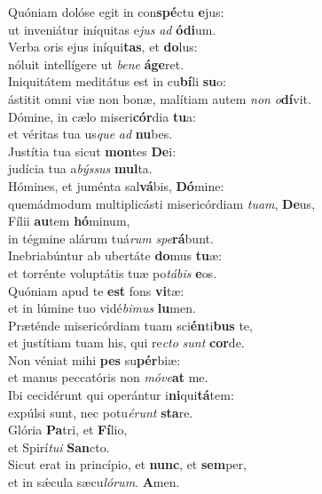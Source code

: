 \evenverse Quóniam dolóse egit in con\textbf{spé}ctu \textbf{e}jus:~\*\\
\evenverse ut inveniátur iníquitas e\textit{jus} \textit{ad} \textbf{ó}\textbf{di}um.\\
\oddverse Verba oris ejus iníqui\textbf{tas}, et \textbf{do}lus:~\*\\
\oddverse nóluit intellígere ut \textit{be}\textit{ne} \textbf{á}\textbf{ge}ret.\\
\evenverse Iniquitátem meditátus est in cu\textbf{bí}li \textbf{su}o:~\*\\
\evenverse ástitit omni viæ non bonæ, malítiam autem \textit{non} \textit{o}\textbf{dí}vit.\\
\oddverse Dómine, in cælo miseri\textbf{cór}dia \textbf{tu}a:~\*\\
\oddverse et véritas tua us\textit{que} \textit{ad} \textbf{nu}bes.\\
\evenverse Justítia tua sicut \textbf{mon}tes \textbf{De}i:~\*\\
\evenverse judícia tua a\textit{býs}\textit{sus} \textbf{mul}ta.\\
\oddverse Hómines, et juménta sal\textbf{vá}bis, \textbf{Dó}mine:~\*\\
\oddverse quemádmodum multiplicásti misericórdiam \textit{tu}\textit{am}, \textbf{De}us,\\
\evenverse Fílii \textbf{au}tem \textbf{hó}minum,~\*\\
\evenverse in tégmine alárum tuá\textit{rum} \textit{spe}\textbf{rá}bunt.\\
\oddverse Inebriabúntur ab ubertáte \textbf{do}mus \textbf{tu}æ:~\*\\
\oddverse et torrénte voluptátis tuæ po\textit{tá}\textit{bis} \textbf{e}os.\\
\evenverse Quóniam apud te \textbf{est} fons \textbf{vi}tæ:~\*\\
\evenverse et in lúmine tuo vidé\textit{bi}\textit{mus} \textbf{lu}men.\\
\oddverse Præténde misericórdiam tuam sci\textbf{én}ti\textbf{bus} te,~\*\\
\oddverse et justítiam tuam his, qui re\textit{cto} \textit{sunt} \textbf{cor}de.\\
\evenverse Non véniat mihi \textbf{pes} su\textbf{pér}biæ:~\*\\
\evenverse et manus peccatóris non \textit{mó}\textit{ve}\textbf{at} me.\\
\oddverse Ibi cecidérunt qui operántur i\textbf{ni}qui\textbf{tá}tem:~\*\\
\oddverse expúlsi sunt, nec potu\textit{é}\textit{runt} \textbf{sta}re.\\
\evenverse Glória \textbf{Pa}tri, et \textbf{Fí}lio,~\*\\
\evenverse et Spirí\textit{tu}\textit{i} \textbf{San}cto.\\
\oddverse Sicut erat in princípio, et \textbf{nunc}, et \textbf{sem}per,~\*\\
\oddverse et in sǽcula sæcu\textit{ló}\textit{rum}. \textbf{A}men.\\
